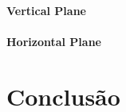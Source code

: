 \documentclass[
	12pt,				%
	openright,			%
	oneside,			%
	a4paper,		%
	chapter=TITLE,		%
	section=TITLE,		%
    brazil,				%
	english,			%
	sumario=tradicional,
	]{abntex2}
\begin{document}
      \subsubsection{Vertical Plane}
      \subsubsection{Horizontal Plane}



\chapter*[Conclusão]{Conclusão}
\lipsum[1-5]


\postextual

% 


\end{document}
